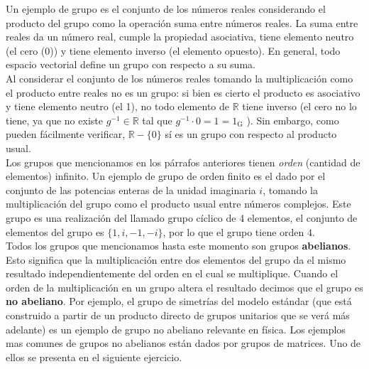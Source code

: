 Un ejemplo de grupo es el conjunto de los números reales considerando el producto del grupo como la operación suma entre números reales. La suma entre reales da un número real, cumple la propiedad asociativa, tiene elemento neutro (el cero (0)) y tiene elemento inverso (el elemento opuesto). En general, todo espacio vectorial define un grupo con respecto a su suma.\\

Al considerar el conjunto de los números reales tomando la multiplicación como el producto entre reales no es un grupo: si bien es cierto el producto es asociativo y tiene elemento neutro (el 1), no todo elemento de $\mathbb{R}$ tiene inverso (el cero no lo tiene, ya que no existe $g^{-1} \in \mathbb{R}$ tal que $g^{-1} \cdot 0=1=1_{\mathrm{G}}$ ).  Sin embargo, como pueden fácilmente verificar, $\mathbb{R}-\{0\}$ sí es un grupo con respecto al producto usual.\\

Los grupos que mencionamos en los párrafos anteriores tienen \emph{orden} (cantidad de elementos) infinito. Un ejemplo de grupo de orden finito es el dado por el conjunto de las potencias enteras de la unidad imaginaria $i$, tomando la multiplicación del grupo como el producto usual entre números complejos. Este grupo es una realización del llamado grupo cíclico de 4 elementos, el conjunto de elementos del grupo es $\{1, i,-1,-i\}$, por lo que el grupo tiene orden $4$.\\

Todos los grupos que mencionamos hasta este momento son grupos \textbf{abelianos}. Esto significa que la multiplicación entre dos elementos del grupo da el mismo resultado independientemente del orden en el cual se multiplique. Cuando el orden de la multiplicación en un grupo altera el resultado decimos que el grupo es \textbf{no abeliano}. Por ejemplo, el grupo de simetrías del modelo estándar (que está construido a partir de un producto directo de grupos unitarios que se verá más adelante) es un ejemplo de grupo no abeliano relevante en física. Los ejemplos mas comunes de grupos no abelianos están dados por grupos de matrices. Uno de ellos se presenta en el siguiente ejercicio.\\

